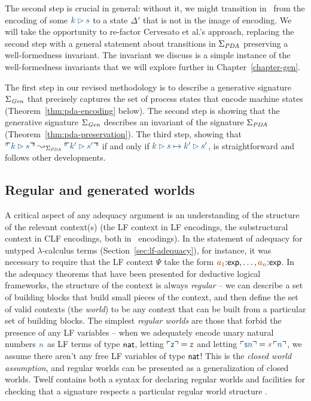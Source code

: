 The second step is crucial in general: without it, we might transition
in \sls~from the encoding of some $\obj{k \rhd s}$ to a state
$\Delta'$ that is not in the image of encoding. %
We will 
take the opportunity to re-factor Cervesato et al.'s approach, 
replacing the second step with a general statement about transitions
in $\Sigma_{\it PDA}$ preserving a well-formedness invariant. The 
invariant we discuss is a simple instance of
the well-formedness invariants that we will explore
further in Chapter~\ref{chapter-gen}. 

The first step in our revised methodology is to describe a generative
signature $\Sigma_{\it Gen}$ that precisely captures the set of
process states that encode machine states
(Theorem~\ref{thm:pda-encoding} below).  The second step is showing
that the generative signature $\Sigma_{\it Gen}$ describes an
invariant of the signature $\Sigma_{\it PDA}$
(Theorem~\ref{thm:pda-preservation}).  The third step, showing that
$\ctxinterp{k \rhd s} \leadsto_{\Sigma_{\it PDA}} \ctxinterp{k' \rhd
  s'}$ if and only if $\obj{k \rhd s} \mapsto \obj{k' \rhd s'}$, is
straightforward and follows other developments.

\subsection{Regular and generated worlds}
\label{sec:framework-reggenworld}

A critical aspect of any adequacy argument is an understanding of the
structure of the relevant context(s) (the LF context in LF encodings,
the substructural context in CLF encodings, both in \sls~encodings).
In the statement of adequacy for untyped $\lambda$-calculus terms
(Section~\ref{sec:lf-adequacy}), for instance, it was necessary to
require that the LF context $\Psi$ take the form $\lf{a_1}{:}{\sf
  exp},\ldots,\lf{a_n}{:}{\sf exp}$. In the adequacy theorems that
have been presented for deductive logical frameworks, the structure of
the context is always {\it regular} -- we can describe a set of
building blocks that build small pieces of the context, and then
define the set of valid contexts (the {\it world}) to be any context
that can be built from a particular set of building blocks.  The
simplest {\it regular worlds} are those that forbid the presence of
any LF variables -- when we adequately encode unary natural numbers
$\obj{n}$ as LF terms of type ${\sf nat}$, letting $\interp{\sf z} =
\lf{\sf z}$ and letting $\interp{{\sf s} n} = \lf{s}\,\interp{n}$, we
assume there aren't any free LF variables of type ${\sf nat}$! This is
the {\it closed world assumption}, and regular worlds can be presented
as a generalization of closed worlds.  Twelf contains both a syntax
for declaring regular worlds and facilities for checking that a
signature respects a particular regular world structure
\cite{schurmann00automating}.

